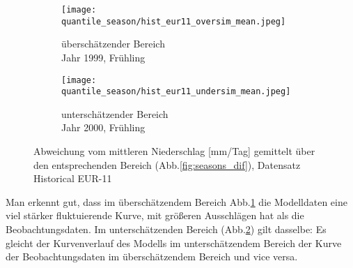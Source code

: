 \begin{figure}[h]
	\begin{subfigure}{0.49\textwidth}
		\texttt{[image: quantile\_season/hist\_eur11\_oversim\_mean.jpeg]}
		\caption{überschätzender Bereich\\Jahr 1999, Frühling}
		\label{fig:seasons:hist_eur11:oversim_mean}
	\end{subfigure}
	\begin{subfigure}{0.49\textwidth}
		\texttt{[image: quantile\_season/hist\_eur11\_undersim\_mean.jpeg]}
		\caption{unterschätzender Bereich\\Jahr 2000, Frühling}
		\label{fig:seasons:hist_eur11:undersim_mean}
	\end{subfigure}
	\caption{Abweichung vom mittleren Niederschlag [mm/Tag] gemittelt über den entsprechenden Bereich (Abb.\ref{fig:seasons_dif}), Datensatz Historical EUR-11}
	\label{fig:seasons:hist_eur11:overundersim_mean}
\end{figure}
Man erkennt gut, dass im überschätzendem Bereich Abb.\ref{fig:seasons:hist_eur11:oversim_mean} die Modelldaten eine viel stärker fluktuierende Kurve, mit größeren Ausschlägen hat als die Beobachtungsdaten.
Im unterschätzenden Bereich (Abb.\ref{fig:seasons:hist_eur11:undersim_mean}) gilt dasselbe: Es gleicht der Kurvenverlauf des Modells im unterschätzendem Bereich der Kurve der Beobachtungsdaten im überschätzendem Bereich und vice versa.\newpage

